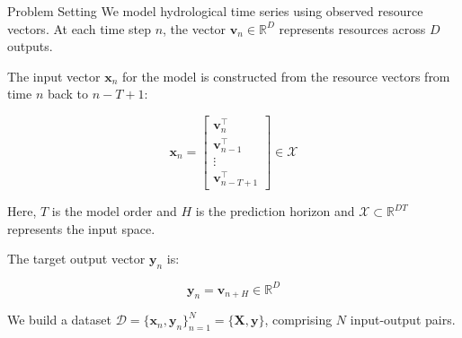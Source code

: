 \begin{frame}{Problem Setting}
	We model hydrological time series using observed resource vectors. At each time step \( n \), the vector \(\mathbf{v}_n \in \mathbb{R}^D\) represents resources across \(D\) outputs.
	
	The input vector \(\mathbf{x}_n\) for the model is constructed from the resource vectors from time \( n \) back to \( n-T+1 \):
	
	\begin{equation*}
		\mathbf{x}_n = \begin{bmatrix} 
			\mathbf{v}_{n}^\top \\ 
			\mathbf{v}_{n-1}^\top \\ 
			\vdots \\ 
			\mathbf{v}_{n-T+1}^\top 
		\end{bmatrix} \in \mathcal{X}
	\end{equation*}
	
	Here, \( T \) is the model order and \( H \) is the prediction horizon and \( \mathcal{X}\subset \mathbb{R}^{DT} \) represents the input space.
	
	\vspace{10pt}
	
	The target output vector \(\mathbf{y}_n\) is:
	
	\begin{equation*}
		\mathbf{y}_n = \mathbf{v}_{n+H} \in \mathbb{R}^{D}
	\end{equation*}
	
	We build a dataset \(\mathcal{D} = \{\mathbf{x}_n, \mathbf{y}_n\}_{n=1}^N  = \{\mathbf{X}, \mathbf{y}\}\), comprising \( N \) input-output pairs.
\end{frame}


